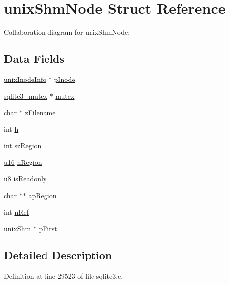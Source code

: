 \hypertarget{structunix_shm_node}{}\section{unix\+Shm\+Node Struct Reference}
\label{structunix_shm_node}


Collaboration diagram for unix\+Shm\+Node\+:
\subsection*{Data Fields}
\begin{DoxyCompactItemize}
\item 
\hyperlink{structunix_inode_info}{unix\+Inode\+Info} $\ast$ \hyperlink{structunix_shm_node_afe19cb877f2c3a50ca04a8272ed435b8}{p\+Inode}
\item 
\hyperlink{structsqlite3__mutex}{sqlite3\+\_\+mutex} $\ast$ \hyperlink{structunix_shm_node_a7bcdded0e06fa908fe1a6df19c3dda21}{mutex}
\item 
char $\ast$ \hyperlink{structunix_shm_node_a47b2dee2615c9bcdc2d8b755dc571e35}{z\+Filename}
\item 
int \hyperlink{structunix_shm_node_a16611451551e3d15916bae723c3f59f7}{h}
\item 
int \hyperlink{structunix_shm_node_acf8ce64e80f5d391b8d68cc6a1d306c5}{sz\+Region}
\item 
\hyperlink{sqlite3_8c_a20f2299e322dcbde37cb07b16910b843}{u16} \hyperlink{structunix_shm_node_af979ee5229cb18d9aba863e14d0bd0c7}{n\+Region}
\item 
\hyperlink{sqlite3_8c_a74a0f6424ae628af25f23f0a35f6ead3}{u8} \hyperlink{structunix_shm_node_aad407d6bd887cadd8d87e5ba9797d6b6}{is\+Readonly}
\item 
char $\ast$$\ast$ \hyperlink{structunix_shm_node_a08adddd4e750630785a4a4d069cfbce9}{ap\+Region}
\item 
int \hyperlink{structunix_shm_node_a3c459f9ae278c22b72583c55ca01acb7}{n\+Ref}
\item 
\hyperlink{structunix_shm}{unix\+Shm} $\ast$ \hyperlink{structunix_shm_node_a683e683f67cac8938671ef8edd2dc730}{p\+First}
\end{DoxyCompactItemize}


\subsection{Detailed Description}


Definition at line 29523 of file sqlite3.\+c.



